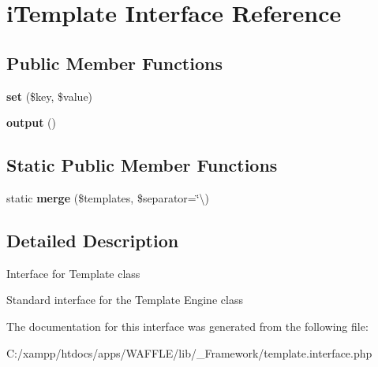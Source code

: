 \hypertarget{interface_w_a_f_f_l_e_1_1_framework_1_1_interfaces_1_1i_template}{}\section{i\+Template Interface Reference}
\label{interface_w_a_f_f_l_e_1_1_framework_1_1_interfaces_1_1i_template}
\subsection*{Public Member Functions}
\begin{DoxyCompactItemize}
\item 
\mbox{\label{interface_w_a_f_f_l_e_1_1_framework_1_1_interfaces_1_1i_template_aab787bd83f84f4215dceb35f7c305eee}} 
{\bfseries set} (\$key, \$value)
\item 
\mbox{\label{interface_w_a_f_f_l_e_1_1_framework_1_1_interfaces_1_1i_template_a3939045b11b9aaefdf692feb963f0dfc}} 
{\bfseries output} ()
\end{DoxyCompactItemize}
\subsection*{Static Public Member Functions}
\begin{DoxyCompactItemize}
\item 
\mbox{\label{interface_w_a_f_f_l_e_1_1_framework_1_1_interfaces_1_1i_template_a35932dacc685dbaaf413695f6dd67f36}} 
static {\bfseries merge} (\$templates, \$separator=\char`\"{}\textbackslash{})
\end{DoxyCompactItemize}


\subsection{Detailed Description}
Interface for Template class

Standard interface for the Template Engine class 

The documentation for this interface was generated from the following file\+:\begin{DoxyCompactItemize}
\item 
C\+:/xampp/htdocs/apps/\+W\+A\+F\+F\+L\+E/lib/\+\_\+\+Framework/template.\+interface.\+php\end{DoxyCompactItemize}

